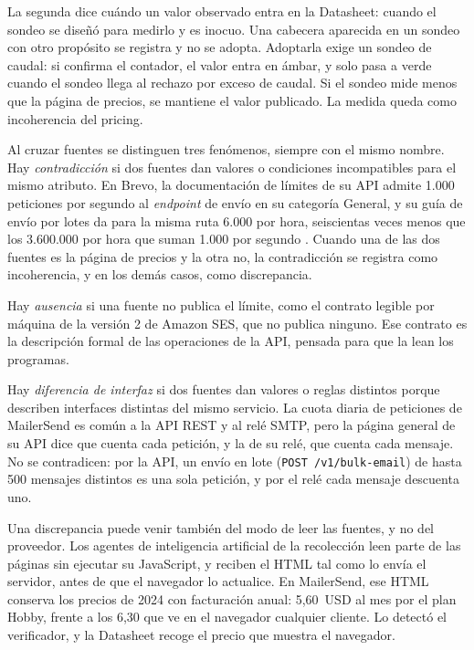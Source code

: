 La segunda dice cuándo un valor observado entra en la Datasheet: cuando el sondeo se diseñó para medirlo y es inocuo.
Una cabecera aparecida en un sondeo con otro propósito se registra y no se adopta.
Adoptarla exige un sondeo de caudal: si confirma el contador, el valor entra en ámbar, y solo pasa a verde cuando el sondeo llega al rechazo por exceso de caudal.
Si el sondeo mide menos que la página de precios, se mantiene el valor publicado.
La medida queda como incoherencia del pricing.

Al cruzar fuentes se distinguen tres fenómenos, siempre con el mismo nombre.
Hay \textit{contradicción} si dos fuentes dan valores o condiciones incompatibles para el mismo atributo.
En Brevo, la documentación de límites de su API admite 1.000 peticiones por segundo al \textit{endpoint} de envío en su categoría General, y su guía de envío por lotes da para la misma ruta 6.000 por hora, seiscientas veces menos que los 3.600.000 por hora que suman 1.000 por segundo \citep{brevodocs}.
Cuando una de las dos fuentes es la página de precios y la otra no, la contradicción se registra como incoherencia, y en los demás casos, como discrepancia.

Hay \textit{ausencia} si una fuente no publica el límite, como el contrato legible por máquina de la versión 2 de Amazon SES, que no publica ninguno.
Ese contrato es la descripción formal de las operaciones de la API, pensada para que la lean los programas.

Hay \textit{diferencia de interfaz} si dos fuentes dan valores o reglas distintos porque describen interfaces distintas del mismo servicio.
La cuota diaria de peticiones de MailerSend es común a la API REST y al relé SMTP, pero la página general de su API dice que cuenta cada petición, y la de su relé, que cuenta cada mensaje.
No se contradicen: por la API, un envío en lote (\texttt{POST /v1/bulk-email}) de hasta 500 mensajes distintos es una sola petición, y por el relé cada mensaje descuenta uno.

Una discrepancia puede venir también del modo de leer las fuentes, y no del proveedor.
Los agentes de inteligencia artificial de la recolección leen parte de las páginas sin ejecutar su JavaScript, y reciben el HTML tal como lo envía el servidor, antes de que el navegador lo actualice.
En MailerSend, ese HTML conserva los precios de 2024 con facturación anual: 5,60~USD al mes por el plan Hobby, frente a los 6,30 que ve en el navegador cualquier cliente.
Lo detectó el verificador, y la Datasheet recoge el precio que muestra el navegador.

